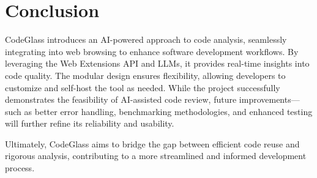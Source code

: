 \section{Conclusion}

CodeGlass introduces an AI-powered approach to code analysis, seamlessly
integrating into web browsing to enhance software development workflows. By
leveraging the Web Extensions API and LLMs, it provides real-time insights into
code quality. The modular design ensures flexibility, allowing developers to
customize and self-host the tool as needed. While the project successfully
demonstrates the feasibility of AI-assisted code review, future improvements—such
as better error handling, benchmarking methodologies, and enhanced testing will
further refine its reliability and usability.

Ultimately, CodeGlass aims to bridge the gap between efficient code reuse and
rigorous analysis, contributing to a more streamlined and informed development
process.
